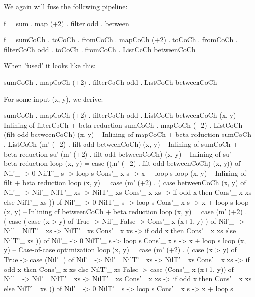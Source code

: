 We again will fuse the following pipeline:
\begin{spec}
f = sum . map (+2) . filter odd . between

f =        sumCoCh        . toCoCh .
fromCoCh . mapCoCh (+2)   . toCoCh .
fromCoCh . filterCoCh odd . toCoCh .
fromCoCh . ListCoCh betweenCoCh
\end{spec}
When 'fused' it looks like this:
\begin{spec}
sumCoCh . mapCoCh (+2) . filterCoCh odd . ListCoCh betweenCoCh
\end{spec}
For some input (x, y), we derive:
\begin{spec}
sumCoCh . mapCoCh (+2) . filterCoCh odd . ListCoCh betweenCoCh (x, y)
-- Inlining of filterCoCh + beta reduction
sumCoCh . mapCoCh (+2) . ListCoCh (filt odd betweenCoCh) (x, y)
-- Inlining of mapCoCh + beta reduction
sumCoCh . ListCoCh (m' (+2) . filt odd betweenCoCh) (x, y)
-- Inlining of sumCoCh + beta reduction
su' (m' (+2) . filt odd betweenCoCh) (x, y)
-- Inlining of su' + beta reduction
loop (x, y) = case ((m' (+2) . filt odd betweenCoCh) (x, y)) of
  Nil'_ -> 0
  NilT'_ s -> loop s
  Cons'_ x s -> x + loop s
loop (x, y)
-- Inlining of filt + beta reduction
loop (x, y) = case (m' (+2) . (
                case betweenCoCh (x, y) of 
                    Nil'_ -> Nil'_
                    NilT'_ xs -> NilT'_ xs
                    Cons'_ x xs -> if odd x then Cons'_ x xs else NilT'_ xs
  )) of
  Nil'_ -> 0
  NilT'_ s -> loop s
  Cons'_ x s -> x + loop s
loop (x, y)
-- Inlining of betweenCoCh + beta reduction
loop (x, y) = case (m' (+2) . (
                case (
                  case (x > y) of
                    True -> Nil'_
                    False -> Cons'_ x (x+1, y)
                  ) of 
                  Nil'_ -> Nil'_
                  NilT'_ xs -> NilT'_ xs
                  Cons'_ x xs -> if odd x then Cons'_ x xs else NilT'_ xs
                )) of
  Nil'_ -> 0
  NilT'_ s -> loop s
  Cons'_ x s -> x + loop s
loop (x, y)
-- Case-of-case optimization
loop (x, y) = case (m' (+2) . (
                case (x > y) of
                  True -> case (Nil'_) of
                    Nil'_ -> Nil'_
                    NilT'_ xs -> NilT'_ xs
                    Cons'_ x xs -> if odd x then Cons'_ x xs else NilT'_ xs
                  False -> case (Cons'_ x (x+1, y)) of
                    Nil'_ -> Nil'_
                    NilT'_ xs -> NilT'_ xs
                    Cons'_ x xs -> if odd x then Cons'_ x xs else NilT'_ xs
                )) of
  Nil'_ -> 0
  NilT'_ s -> loop s
  Cons'_ x s -> x + loop s

\end{spec}
